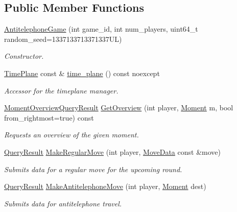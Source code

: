 \subsection*{Public Member Functions}
\begin{DoxyCompactItemize}
\item 
\hyperlink{class_antitelephone_game_a78654d7658827209499cd5fb6650ee61}{Antitelephone\+Game} (int game\+\_\+id, int num\+\_\+players, uint64\+\_\+t random\+\_\+seed=1337133713371337\+U\+L)
\begin{DoxyCompactList}\small\item\em Constructor. \end{DoxyCompactList}\item 
\hyperlink{classtimeplane_1_1_time_plane}{Time\+Plane} const  \& \hyperlink{class_antitelephone_game_adeaf2aa0a4015b04e688e2b694861a9c}{time\+\_\+plane} () const noexcept
\begin{DoxyCompactList}\small\item\em Accessor for the timeplane manager. \end{DoxyCompactList}\item 
\hyperlink{class_antitelephone_game_a99ab937cb4918da1c80bd8d07e43f920}{Moment\+Overview\+Query\+Result} \hyperlink{class_antitelephone_game_a4f0700772c0160ecbdcd9a136b493768}{Get\+Overview} (int player, \hyperlink{classtimeplane_1_1_moment}{Moment} m, bool from\+\_\+rightmost=true) const
\begin{DoxyCompactList}\small\item\em Requests an overview of the given moment. \end{DoxyCompactList}\item 
\hyperlink{class_query_result}{Query\+Result} \hyperlink{class_antitelephone_game_af4d2547790e79bbf4413a68667821bed}{Make\+Regular\+Move} (int player, \hyperlink{classexternal_1_1_move_data}{Move\+Data} const \&move)
\begin{DoxyCompactList}\small\item\em Submits data for a regular move for the upcoming round. \end{DoxyCompactList}\item 
\hyperlink{class_query_result}{Query\+Result} \hyperlink{class_antitelephone_game_ab0737de4620c0f35eede4c3a8c13da1a}{Make\+Antitelephone\+Move} (int player, \hyperlink{classtimeplane_1_1_moment}{Moment} dest)
\begin{DoxyCompactList}\small\item\em Submits data for antitelephone travel. \end{DoxyCompactList}\item 

\end{DoxyCompactItemize}
